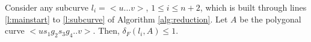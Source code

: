 \documentclass[a4paper,UKenglish]{lipics}
\newcommand{\CS}{{\mathscr S}}
\newcommand{\CQ}{{\mathscr Q}}
\newcommand{\gre}{{g}}
\newcommand{\sma}{{s}}
\newcommand{\cfev}{{l}} \newcommand{\sq}{{\CS\CQ}}
\newcommand{\distF}{\delta_F}
\begin{document}
\begin{lemma}\label{lemma:PathA}
Consider any subcurve $\cfev_i =<u \dots v>$, $1\le i \le n+2$,  
which is built through lines \ref{l:mainstart} to \ref{l:subcurve} 
of Algorithm \ref{alg:reduction}. Let $A$ be the polygonal curve  $<u\sma_1\gre_2\sma_3\gre_4..v>$. Then, $\distF(\cfev_i,A) \le 1$.
\end{lemma}
\end{document}
